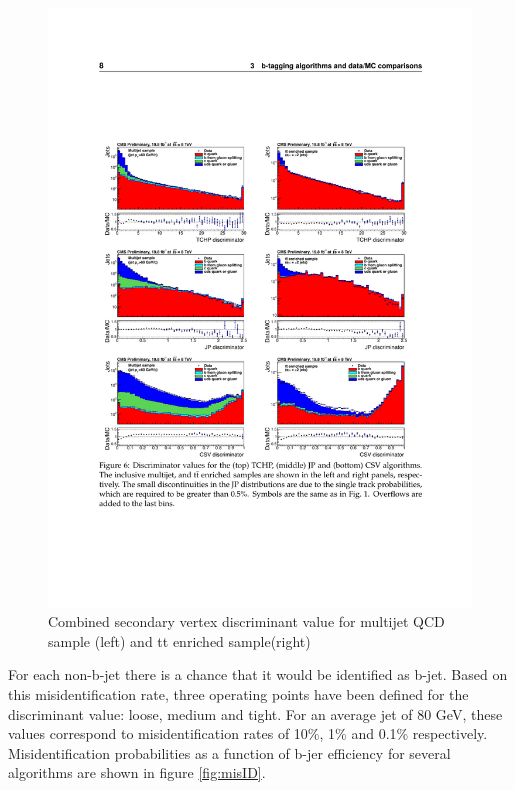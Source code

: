 \begin{figure}[ht]
	\includegraphics[width=\textwidth]{Figures/b-tag_csv.pdf}
	\caption{Combined secondary vertex discriminant value for multijet QCD sample (left) and tt enriched sample(right)\cite{CMS:2013vea}}
	\label{fig:csv}
\end{figure}
For each non-b-jet there is a chance that it would be identified as b-jet. Based on this misidentification rate, three operating points have been defined for the discriminant value: loose, medium and tight. For an average jet of 80 GeV, these values correspond to misidentification rates of 10\%, 1\% and 0.1\% respectively. Misidentification probabilities as a function of b-jer efficiency for several algorithms are shown in figure \ref{fig:misID}. 
